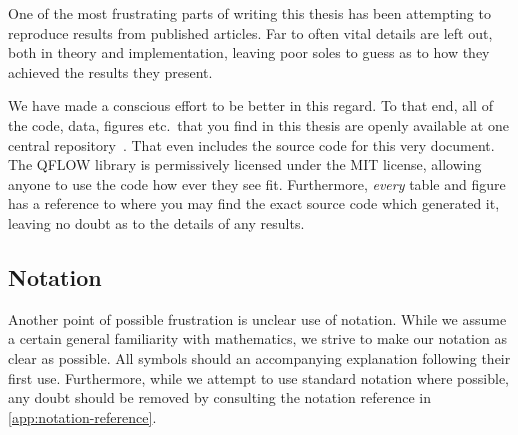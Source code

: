 \documentclass[Thesis.tex]{subfiles}
\begin{document}
One of the most frustrating parts of writing this thesis has been attempting to
reproduce results from published articles. Far to often vital details are left
out, both in theory and implementation, leaving poor soles to guess as to how
they achieved the results they present.

We have made a conscious effort to be
better in this regard. To that end, all of the code, data, figures etc.\ that
you find in this thesis are openly available at one central
repository~\cite{qflow}. That even includes the source code for this very
document. The QFLOW library is permissively licensed under the MIT license,
allowing anyone to use the code how ever they see fit. Furthermore, \emph{every} table
and figure has a reference to where you may find the exact source code which
generated it, leaving no doubt as to the details of any results.

\subsection{Notation}

Another point of possible frustration is unclear use of notation. While we
assume a certain general familiarity with mathematics, we strive to make our
notation as clear as possible. All symbols should an accompanying
explanation following their first use. Furthermore, while we attempt to use
standard notation where possible, any doubt should be removed by consulting the
notation reference in \cref{app:notation-reference}.
\end{document}
